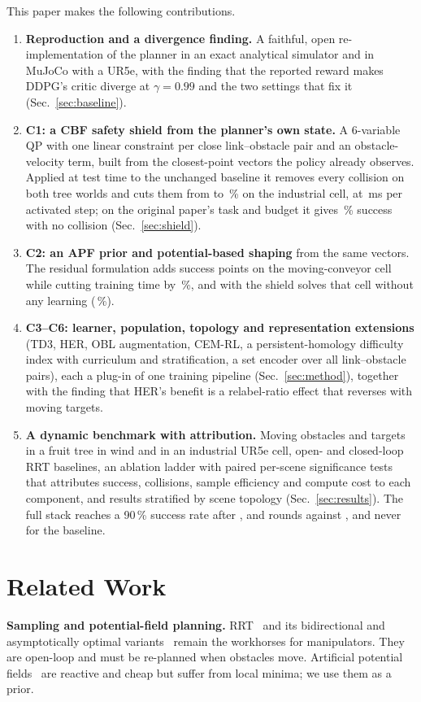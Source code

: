 \documentclass[conference]{IEEEtran}
\begin{document}
This paper makes the following contributions.
\begin{enumerate}
\item \textbf{Reproduction and a divergence finding.} A faithful, open re-implementation of the planner in an exact analytical simulator and in MuJoCo with a UR5e, with the finding that the reported reward makes DDPG's critic diverge at $\gamma=0.99$ and the two settings that fix it (Sec.~\ref{sec:baseline}).
\item \textbf{C1: a CBF safety shield from the planner's own state.} A 6-variable QP with one linear constraint per close link--obstacle pair and an obstacle-velocity term, built from the closest-point vectors the policy already observes. Applied at test time to the unchanged baseline it removes every collision on both tree worlds and cuts them from \Curebase{} to \Cureshieldevalcm\,\% on the industrial cell, at \shieldms{}\,ms per activated step; on the original paper's task and budget it gives \Sstaticshieldevalcmk\,\% success with no collision (Sec.~\ref{sec:shield}).
\item \textbf{C2: an APF prior and potential-based shaping} from the same vectors. The residual formulation adds \gSuretdherapf{} success points on the moving-conveyor cell while cutting training time by \gWuretdherapf{}\,\%, and with the shield solves that cell without any learning (\Sureapfshieldeval\,\%).
\item \textbf{C3--C6: learner, population, topology and representation extensions} (TD3, HER, OBL augmentation, CEM-RL, a persistent-homology difficulty index with curriculum and stratification, a set encoder over all link--obstacle pairs), each a plug-in of one training pipeline (Sec.~\ref{sec:method}), together with the finding that HER's benefit is a relabel-ratio effect that reverses with moving targets.
\item \textbf{A dynamic benchmark with attribution.} Moving obstacles and targets in a fruit tree in wind and in an industrial UR5e cell, open- and closed-loop RRT baselines, an ablation ladder with paired per-scene significance tests that attributes success, collisions, sample efficiency and compute cost to each component, and results stratified by scene topology (Sec.~\ref{sec:results}). The full stack reaches a 90\,\% success rate after \Rstaticfullk{}, \Rwindfullk{} and \Rurefullk{} rounds against \Rstaticbase{}, \Rwindbase{} and never for the baseline.
\end{enumerate}

\section{Related Work}\label{sec:related}
\textbf{Sampling and potential-field planning.} RRT~\cite{lavalle1998rrt} and its bidirectional and asymptotically optimal variants~\cite{kuffner2000rrtconnect,karaman2011rrtstar} remain the workhorses for manipulators. They are open-loop and must be re-planned when obstacles move. Artificial potential fields~\cite{khatib1986apf} are reactive and cheap but suffer from local minima; we use them as a prior.
\end{document}
